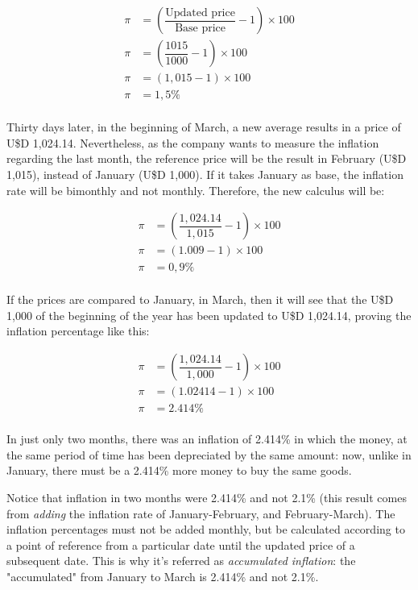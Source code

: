\documentclass[12pt,a4paper,twoside]{book}
\begin{document}
\begin{align*}
\pi &= \left( \dfrac{\text{Updated price}}{\text{Base price}} - 1 \right) \times 100 \\
\pi &= \left( \dfrac{1015}{1000} -1 \right) \times 100 \\
\pi &= \left( 1,015 - 1 \right) \times 100 \\
\pi &= 1,5 \% \\
\end{align*}

Thirty days later, in the beginning of March, a new average results in a price of U\$D 1,024.14. Nevertheless, as the company wants to measure the inflation regarding the last month, the reference price will be the result in February (U\$D 1,015), instead of January (U\$D 1,000). If it takes January as base, the inflation rate will be bimonthly and not monthly. Therefore, the new calculus will be:

\begin{align*}
\pi &= \left( \dfrac{1,024.14}{1,015} -1 \right) \times 100 \\
\pi &= \left( 1.009 - 1 \right) \times 100 \\
\pi &= 0,9 \% \\
\end{align*}

If the prices are compared to January, in March, then it will see that the U\$D 1,000 of the beginning of the year has been updated to U\$D 1,024.14, proving the inflation percentage like this:

\begin{align*}
\pi &= \left( \dfrac{1,024.14}{1,000} -1 \right) \times 100 \\
\pi &= \left( 1.02414 - 1 \right) \times 100 \\
\pi &= 2.414 \% \\
\end{align*}

In just only two months, there was an inflation of 2.414\% in which the money, at the same period of time has been depreciated by the same amount: now, unlike in January, there must be a 2.414\% more money to buy the same goods.

Notice that inflation in two months were 2.414\% and not 2.1\% (this result comes from \textit{adding} the inflation rate of January-February, and February-March). The inflation percentages must not be added monthly, but be calculated according to a point of reference from a particular date until the updated price of a subsequent date. This is why it's referred as \textit{accumulated inflation}: the "accumulated" from January to March is 2.414\% and not 2.1\%.
\end{document}
